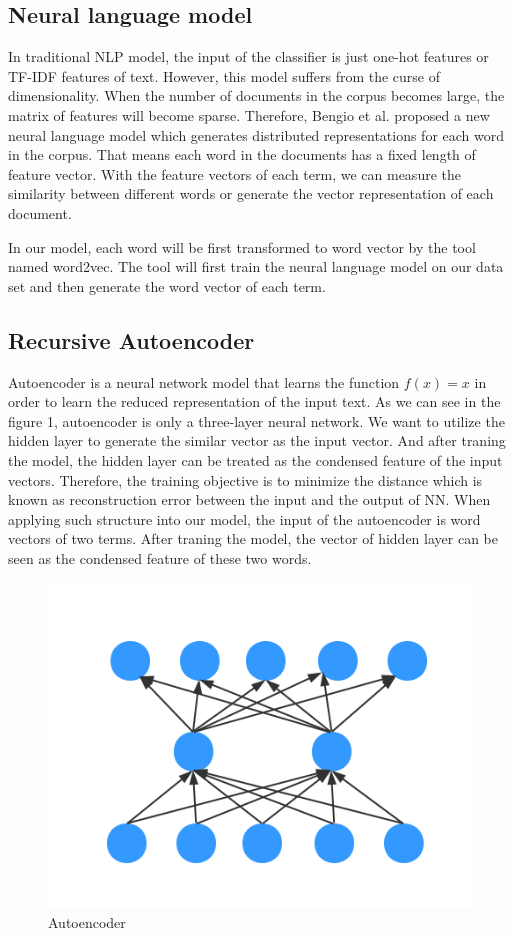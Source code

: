 \documentclass[dvips,9pt]{article}
\begin{document}
\subsection{Neural language model}
In traditional NLP model, the input of the classifier is just one-hot features or TF-IDF features of text. However, this model suffers from the curse of dimensionality. When the number of documents in the corpus becomes large, the matrix of features will become sparse. Therefore, Bengio et al.\cite{Bengio2003NLP} proposed a new neural language model which generates distributed representations for each word in the corpus. That means each word in the documents has a fixed length of feature vector. With the feature vectors of each term, we can measure the similarity between different words or generate the vector representation of each document.

In our model, each word will be first transformed to word vector by the tool named word2vec\cite{mikolov2013efficient}. The tool will first train the neural language model on our data set and then generate the word vector of each term.

\subsection{Recursive Autoencoder}
Autoencoder is a neural network model that learns the function $f(x)=x$ in order to learn the reduced representation of the input text. As we can see in the figure 1, autoencoder is only a three-layer neural network. We want to utilize the hidden layer to generate the similar vector as the input vector. And after traning the model, the hidden layer can be treated as the condensed feature of the input vectors. Therefore, the training objective is to minimize the distance which is known as reconstruction error between the input and the output of NN. When applying such structure into our model, the input of the autoencoder is word vectors of two terms. After traning the model, the vector of hidden layer can be seen as the condensed feature of these two words.

\begin{figure}[ht]
\centering
\includegraphics[width = 0.8\linewidth]{figure/autoencoder}
\caption{Autoencoder}
\label{fig:ae}
\end{figure}
\end{document}
